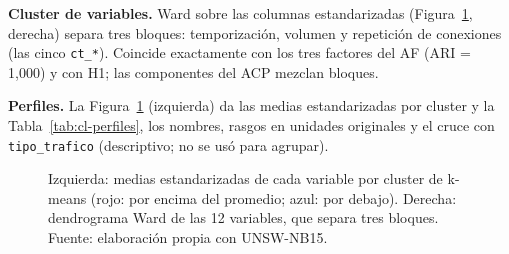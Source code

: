 \textbf{Cluster de variables.} Ward sobre las columnas estandarizadas (Figura~\ref{fig:cl-perfiles}, derecha) separa tres bloques: temporización, volumen y repetición de conexiones (las cinco \texttt{ct\_*}). Coincide exactamente con los tres factores del AF (ARI = 1,000) y con H1; las componentes del ACP mezclan bloques.

\textbf{Perfiles.} La Figura~\ref{fig:cl-perfiles} (izquierda) da las medias estandarizadas por cluster y la Tabla~\ref{tab:cl-perfiles}, los nombres, rasgos en unidades originales y el cruce con \texttt{tipo\_trafico} (descriptivo; no se usó para agrupar).

\begin{figure}[htbp]
  \centering
  \caption[Perfiles por cluster y dendrograma de variables]{Izquierda: medias estandarizadas de cada variable por cluster de k-means (rojo: por encima del promedio; azul: por debajo). Derecha: dendrograma Ward de las 12 variables, que separa tres bloques. Fuente: elaboración propia con UNSW-NB15.}
  \label{fig:cl-perfiles}
\end{figure}

